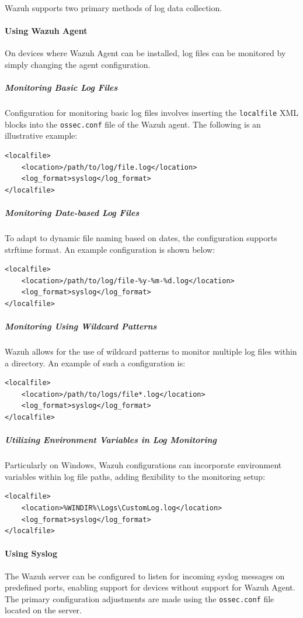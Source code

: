 Wazuh supports two primary methods of log data collection.
\paragraph{Using Wazuh Agent}
On devices where Wazuh Agent can be installed, log files can be monitored by simply changing the agent configuration.

\subparagraph{Monitoring Basic Log Files}
Configuration for monitoring basic log files involves inserting the \texttt{localfile} XML blocks into the \texttt{ossec.conf} file of the Wazuh agent. The following is an illustrative example:

\begin{verbatim}
<localfile>
    <location>/path/to/log/file.log</location>
    <log_format>syslog</log_format>
</localfile>
\end{verbatim}

\subparagraph{Monitoring Date-based Log Files}
To adapt to dynamic file naming based on dates, the configuration supports strftime format. An example configuration is shown below:

\begin{verbatim}
<localfile>
    <location>/path/to/log/file-%y-%m-%d.log</location>
    <log_format>syslog</log_format>
</localfile>
\end{verbatim}

\subparagraph{Monitoring Using Wildcard Patterns}
Wazuh allows for the use of wildcard patterns to monitor multiple log files within a directory. An example of such a configuration is:

\begin{verbatim}
<localfile>
    <location>/path/to/logs/file*.log</location>
    <log_format>syslog</log_format>
</localfile>
\end{verbatim}

\subparagraph{Utilizing Environment Variables in Log Monitoring}
Particularly on Windows, Wazuh configurations can incorporate environment variables within log file paths, adding flexibility to the monitoring setup:

\begin{verbatim}
<localfile>
    <location>%WINDIR%\Logs\CustomLog.log</location>
    <log_format>syslog</log_format>
</localfile>
\end{verbatim}

\paragraph{Using Syslog}
The Wazuh server can be configured to listen for incoming syslog messages on predefined ports, enabling support for devices without support for Wazuh Agent. The primary configuration adjustments are made using the \texttt{ossec.conf} file located on the server.

